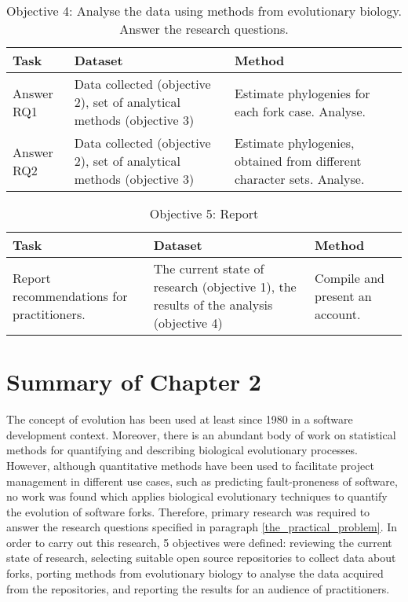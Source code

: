 \begin{table}[H]
\caption*{Objective 4: Analyse the data using methods from evolutionary biology. Answer the research questions.}
\label{table:objective4}
\centering
\begin{tabu} to 
\toprule
Task & Dataset & Method \\
\midrule
Answer RQ1 & Data collected (objective 2), set of analytical methods (objective 3) & Estimate phylogenies for each fork case. Analyse. \\
\midrule
Answer RQ2 & Data collected (objective 2), set of analytical methods (objective 3) & Estimate phylogenies, obtained from different character sets. Analyse. \\
\bottomrule
\end{tabu}
\end{table}

\begin{table}[H]
\caption*{Objective 5: Report}
\centering
\begin{tabu} to 
\toprule
Task & Dataset & Method \\
\midrule
Report recommendations for practitioners. & The current state of research (objective 1), the results of the analysis (objective 4) & Compile and present an account. \\
\bottomrule
\end{tabu}
\end{table}


\section{Summary of Chapter 2}
The concept of evolution has been used at least since 1980 in a software development context. Moreover, there is an abundant body of work on statistical methods for quantifying and describing biological evolutionary processes. However, although quantitative methods have been used to facilitate project management in different use cases, such as predicting fault-proneness of software, no work was found which applies biological evolutionary techniques to quantify the evolution of software forks. Therefore, primary research was required to answer the research questions specified in paragraph \ref{the_practical_problem}. In order to carry out this research, 5 objectives were defined: reviewing the current state of research, selecting suitable open source repositories to collect data about forks, porting methods from evolutionary biology to analyse the data acquired from the repositories, and reporting the results for an audience of practitioners.

